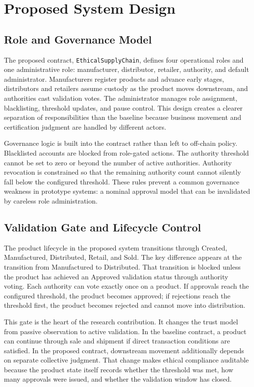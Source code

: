 \documentclass[conference]{IEEEtran}
\begin{document}
\section{Proposed System Design}

\subsection{Role and Governance Model}

The proposed contract, \texttt{EthicalSupplyChain}, defines four operational roles and one administrative role: manufacturer, distributor, retailer, authority, and default administrator. Manufacturers register products and advance early stages, distributors and retailers assume custody as the product moves downstream, and authorities cast validation votes. The administrator manages role assignment, blacklisting, threshold updates, and pause control. This design creates a clearer separation of responsibilities than the baseline because business movement and certification judgment are handled by different actors.

Governance logic is built into the contract rather than left to off-chain policy. Blacklisted accounts are blocked from role-gated actions. The authority threshold cannot be set to zero or beyond the number of active authorities. Authority revocation is constrained so that the remaining authority count cannot silently fall below the configured threshold. These rules prevent a common governance weakness in prototype systems: a nominal approval model that can be invalidated by careless role administration.

\subsection{Validation Gate and Lifecycle Control}

The product lifecycle in the proposed system transitions through Created, Manufactured, Distributed, Retail, and Sold. The key difference appears at the transition from Manufactured to Distributed. That transition is blocked unless the product has achieved an Approved validation status through authority voting. Each authority can vote exactly once on a product. If approvals reach the configured threshold, the product becomes approved; if rejections reach the threshold first, the product becomes rejected and cannot move into distribution.

This gate is the heart of the research contribution. It changes the trust model from passive observation to active validation. In the baseline contract, a product can continue through sale and shipment if direct transaction conditions are satisfied. In the proposed contract, downstream movement additionally depends on separate collective judgment. That change makes ethical compliance auditable because the product state itself records whether the threshold was met, how many approvals were issued, and whether the validation window has closed.
\end{document}
